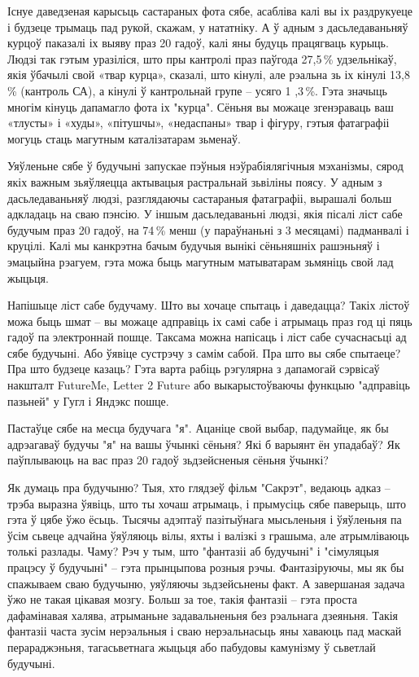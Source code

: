 Існуе даведзеная карысьць састараных фота сябе, асабліва калі вы іх раздрукуеце і будзеце трымаць пад рукой, скажам, у нататніку. А ў адным з дасьледаваньняў курцоў паказалі іх выяву праз 20 гадоў, калі яны будуць працягваць курыць. Людзі так гэтым уразіліся, што пры кантролі праз паўгода 27,5\,\% удзельнікаў, якія ўбачылі свой «твар курца», сказалі, што кінулі, але рэальна зь іх кінулі 13,8\,\% (кантроль СА), а кінулі ў кантрольнай групе – усяго 1 ,3\,\%. Гэта значыць многім кінуць дапамагло фота іх "курца". Сёньня вы можаце згенэраваць ваш «тлусты» і «худы», «пітушчы», «недаспаны» твар і фігуру, гэтыя фатаграфіі могуць стаць магутным каталізатарам зьменаў.

Уяўленьне сябе ў будучыні запускае пэўныя нэўрабіялягічныя мэханізмы, сярод якіх важным зьяўляецца актывацыя растральнай зьвіліны поясу. У адным з дасьледаваньняў людзі, разглядаючы састараныя фатаграфіі, вырашалі больш адкладаць на сваю пэнсію. У іншым дасьледаваньні людзі, якія пісалі ліст сабе будучым праз 20 гадоў, на 74\,\% менш (у параўнаньні з 3 месяцамі) падманвалі і круцілі. Калі мы канкрэтна бачым будучыя вынікі сёньняшніх рашэньняў і эмацыйна рэагуем, гэта можа быць магутным матыватарам зьмяніць свой лад жыцьця. 

Напішыце ліст сабе будучаму. Што вы хочаце спытаць і даведацца? Такіх лістоў можа быць шмат – вы можаце адправіць іх самі сабе і атрымаць праз год ці пяць гадоў па электроннай пошце. Таксама можна напісаць і ліст сабе сучаснасьці ад сябе будучыні. Або ўявіце сустрэчу з самім сабой. Пра што вы сябе спытаеце? Пра што будзеце казаць? Гэта варта рабіць рэгулярна з дапамогай сэрвісаў накшталт FutureMe, Letter 2 Future або выкарыстоўваючы функцыю "адправіць пазьней" у Гугл і Яндэкс пошце.

Пастаўце сябе на месца будучага "я". Ацаніце свой выбар, падумайце, як бы адрэагаваў будучы "я" на вашы ўчынкі сёньня? Які б варыянт ён упадабаў? Як паўплываюць на вас праз 20 гадоў зьдзейсненыя сёньня ўчынкі?

Як думаць пра будучыню? Тыя, хто глядзеў фільм "Сакрэт", ведаюць адказ – трэба выразна ўявіць, што ты хочаш атрымаць, і прымусіць сябе паверыць, што гэта ў цябе ўжо ёсьць. Тысячы адэптаў пазітыўнага мысьленьня і ўяўленьня па ўсім сьвеце адчайна ўяўляюць вілы, яхты і валізкі з грашыма, але атрымліваюць толькі разлады. Чаму? Рэч у тым, што "фантазіі аб будучыні" і "сімуляцыя працэсу ў будучыні" – гэта прынцыпова розныя рэчы. Фантазіруючы, мы як бы спажываем сваю будучыню, уяўляючы зьдзейсьнены факт. А завершаная задача ўжо не такая цікавая мозгу. Больш за тое, такія фантазіі – гэта проста дафамінавая халява, атрыманьне задавальненьня без рэальнага дзеяньня. Такія фантазіі часта зусім нерэальныя і сваю нерэальнасьць яны хаваюць пад маскай перараджэньня, тагасьветнага жыцьця або пабудовы камунізму ў сьветлай будучыні.

